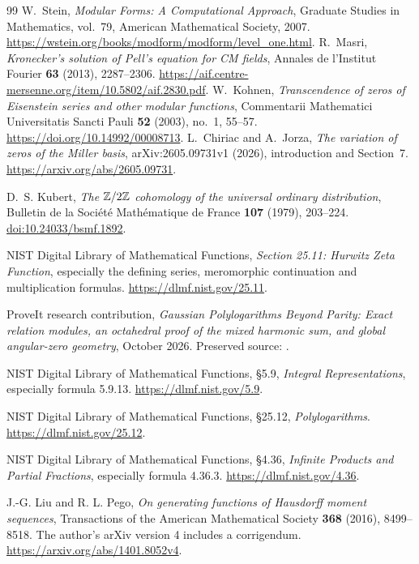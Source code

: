 \begin{thebibliography}{99}
W.~Stein, \emph{Modular Forms: A Computational Approach},
Graduate Studies in Mathematics, vol.~79, American Mathematical Society, 2007.
\url{https://wstein.org/books/modform/modform/level_one.html}.
R.~Masri, \emph{Kronecker's solution of Pell's equation for CM fields},
Annales de l'Institut Fourier \textbf{63} (2013), 2287--2306.
\url{https://aif.centre-mersenne.org/item/10.5802/aif.2830.pdf}.
W.~Kohnen, \emph{Transcendence of zeros of Eisenstein series and other
modular functions}, Commentarii Mathematici Universitatis Sancti Pauli
\textbf{52} (2003), no.~1, 55--57.
\url{https://doi.org/10.14992/00008713}.
L.~Chiriac and A.~Jorza, \emph{The variation of zeros of the Miller basis},
arXiv:2605.09731v1 (2026), introduction and Section~7.
\url{https://arxiv.org/abs/2605.09731}.


D.~S. Kubert, \emph{The $\mathbb{Z}/2\mathbb{Z}$ cohomology of the universal ordinary
 distribution}, Bulletin de la Soci\'et\'e Math\'ematique de France
\textbf{107} (1979), 203--224.
\href{https://doi.org/10.24033/bsmf.1892}{doi:10.24033/bsmf.1892}.

NIST Digital Library of Mathematical Functions,
\emph{Section 25.11: Hurwitz Zeta Function}, especially the defining series,
meromorphic continuation and multiplication formulas.
\url{https://dlmf.nist.gov/25.11}.


ProveIt research contribution, \emph{Gaussian Polylogarithms Beyond Parity:
Exact relation modules, an octahedral proof of the mixed harmonic sum,
and global angular-zero geometry}, October 2026.
Preserved source: .

NIST Digital Library of Mathematical Functions, \S5.9,
\emph{Integral Representations}, especially formula 5.9.13.
\url{https://dlmf.nist.gov/5.9}.

NIST Digital Library of Mathematical Functions, \S25.12,
\emph{Polylogarithms}.
\url{https://dlmf.nist.gov/25.12}.

NIST Digital Library of Mathematical Functions, \S4.36,
\emph{Infinite Products and Partial Fractions}, especially formula 4.36.3.
\url{https://dlmf.nist.gov/4.36}.

J.-G. Liu and R. L. Pego, \emph{On generating functions of Hausdorff
moment sequences}, Transactions of the American Mathematical Society
\textbf{368} (2016), 8499--8518. The author's arXiv version 4 includes
 a corrigendum. \url{https://arxiv.org/abs/1401.8052v4}.


\end{thebibliography}
